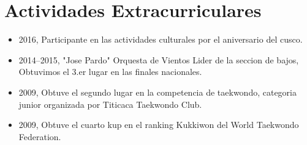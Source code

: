 \documentclass[11pt,a4paper,sans]{moderncv} %
\begin{document}
\section{Actividades Extracurriculares}
\begin{itemize}
\item{2016, Participante en las actividades culturales por el aniversario del cusco.}
\item{2014--2015, "Jose Pardo" Orquesta de Vientos Lider de la seccion de bajos, Obtuvimos el 3.er lugar en las finales nacionales.}
\item{2009, Obtuve el segundo lugar en la competencia de taekwondo, categoria junior organizada por Titicaca Taekwondo Club.}
\item{2009, Obtuve el cuarto kup en el ranking Kukkiwon del World Taekwondo Federation.}
\end{itemize}











\end{document}

